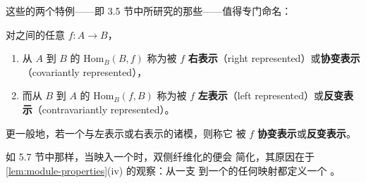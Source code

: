 这些\trCommaModule{}的两个特例——即 3.5 节中所研究的那些——值得专门命名：

\begin{definition}\label{def:represented-modules}
对\trInfinityCategory{}之间的任意\trFunctor{} $f\colon A\to B$，
\begin{enumerate}[label=(\roman*)]
\item 从 $A$ 到 $B$ 的\trModule{} $\mathrm{Hom}_{B}(B,f)$ 称为被 $f$
\textbf{右表示}（right represented）或\textbf{协变表示}（covariantly
represented），
\item 而从 $B$ 到 $A$ 的\trModule{} $\mathrm{Hom}_{B}(f,B)$ 称为被 $f$
\textbf{左表示}（left represented）或\textbf{反变表示}（contravariantly
represented）。
\end{enumerate}
更一般地，若一个\trModule{}与左表示或右表示的诸模\trFiberedEquivalence{}，则称它
被 $f$ \textbf{协变表示}或\textbf{反变表示}。
\end{definition}

如 5.7 节中那样，当映入一个\trModule{}时，双侧纤维化的\trYonedaLemma{}便会
简化，其原因在于\cref{lem:module-properties}(iv) 的观察：从一支%
\trTwoSidedFibration{}到一个\trModule{}的任何\trSpan{}映射都定义一个%
\trCartesianFunctor{}。

